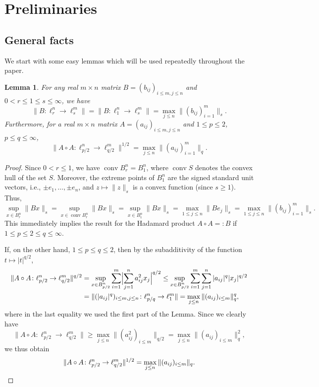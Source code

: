 \documentclass[a4paper]{amsart}
\newtheorem{lemma}[theorem]{Lemma}
\theoremstyle{definition}
\theoremstyle{remark}
\numberwithin{equation}{section}
\newcommand*{\hadprod}{\mathbin{\circ}} %
\newcommand*{\conv}{\operatorname{conv}} %
\begin{document}
%
\section{Preliminaries}
\label{sec:preliminaries}
%


%
\subsection{General facts}
%

We start with some easy lemmas which will be used repeatedly throughout the paper.

\begin{lemma}
	\label{lem:special-norms}
	For any real $m\times n$ matrix $B = (b_{ij})_{i\leq m, j\leq n}$ and $0<r\leq 1\leq s\leq \infty$,
	we have
	\[
	\|B \colon \ell^n_{r} \to \ell^m_{s} \|
	=\|B\colon \ell^n_{1} \to \ell^m_{s} \|
	= \max_{j\leq n} \| (b_{ij})_{i=1}^m\|_s.
	\]
	Furthermore, for a real $m\times n$ matrix $A = (a_{ij})_{i\leq m, j\leq n}$ and $1\leq p\leq 2$,
	$p \leq q\leq \infty$,
		\[
	\|A\hadprod A \colon \ell^n_{p/2} \to \ell^m_{q/2} \|^{1/2}
	= \max_{j\leq n} \| (a_{ij})_{i=1}^m\|_q.
	\]
\end{lemma}

\begin{proof}
	Since $0<r\leq 1$, we have $\conv B_r^n = B_1^n$, where $\conv S$ denotes the convex hull of the set $S$.
	Moreover,  the extreme points of $B_1^n$ are the signed standard unit vectors, i.e., $\pm e_1,\dots,\pm e_n$, and  $z\mapsto \|z\|_s$ is a convex function (since $s\ge 1$). Thus,
	\[
	\sup_{x\in B_r^n} \|Bx\|_s  = \sup_{x\in \conv B_r^n} \|Bx\|_s  = \sup_{x\in B_1^n}\|Bx\|_s = \max_{1\leq j \leq n} \|Be_j\|_s = \max_{1\leq j \leq n} \|(b_{ij})_{i=1}^m\|_s.
	\]
	This immediately implies the result for the Hadamard product $A\circ A=:B$ if $1\leq p\leq 2\leq q\leq \infty$. 
	
	    If, on the other hand, $1\leq p\leq q\leq 2$, 
    then by the subadditivity of the function $t\mapsto |t|^{q/2}$,
    \begin{align*}
    \|A\hadprod A\colon \ell_{p/2}^n \to \ell_{q/2}^m\|^{q/2}
        &= \sup_{x \in B_{p/2}^n} \sum_{i=1}^m \Bigl|\sum_{j=1}^n a_{ij}^2 x_j\Bigr|^{q/2}
    \le \sup_{x \in B_{p/2}^n} \sum_{i=1}^m \sum_{j=1}^n |a_{ij}|^{q} |x_j|^{q/2} \\
    &= \|(|a_{ij}|^q)_{i\le m,j\le n}\colon \ell_{p/q}^n\to \ell_{1}^m\|
    = \max_{j\le n} \|(a_{ij})_{i\le m}\|_q^q,
    \end{align*}
    where in the last equality we used the  first part of the Lemma. 
    Since we clearly have 
    \begin{displaymath}
    \|A\hadprod A\colon \ell_{p/2}^n \to \ell_{q/2}^m\| \ge \max_{j\le n}\|(a_{ij}^2)_{i\le m}\|_{q/2} =  \max_{j\le n}\|(a_{ij})_{i\le m}\|_{q}^2,
    \end{displaymath}
    we thus obtain
    \begin{equation*}
    \|A\hadprod A\colon \ell_{p/2}^n \to \ell_{q/2}^m\|^{1/2} = \max_{j\le n}\|(a_{ij})_{i\le m}\|_{q}.\qedhere
    \end{equation*} 
\end{proof}
\end{document}
